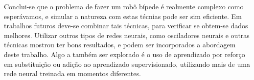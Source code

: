\documentclass[twoside,conference,a4paper]{IEEEtran}
\begin{document}
Conclui-se que o problema de fazer um robô bípede é realmente complexo como esperávamos, e simular a natureza com estas técnias pode ser sim eficiente. Em trabalhos futuros deve-se combinar tais técnicas, para verificar se obtem-se dados melhores. Utilizar outros tipos de redes neurais, como osciladores neurais e outras técnicas \cite{cpgs} mostrou ter bons resultados, e podem ser incorporados a abordagem deste trabalho. Algo a também ser explorado é o uso de aprendizado por reforço em substituição ou adição ao aprendizado supervisionado, utilizando mais de uma rede neural treinada em momentos diferentes.

\nocite{Aula}



\end{document}
